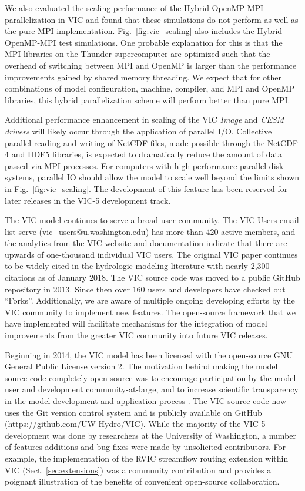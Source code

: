 \documentclass[gmd, manuscript]{copernicus}
\begin{document}
  We also evaluated the scaling performance of the Hybrid OpenMP-MPI parallelization in VIC and found that these simulations do not perform as well as the pure MPI implementation. Fig.~\ref{fig:vic_scaling} also includes the Hybrid OpenMP-MPI test simulations. One probable explanation for this is that the MPI libraries on the Thunder supercomputer are optimized such that the overhead of switching between MPI and OpenMP is larger than the performance improvements gained by shared memory threading. We expect that for other combinations of model configuration, machine, compiler, and MPI and OpenMP libraries, this hybrid parallelization scheme will perform better than pure MPI.

  Additional performance enhancement in scaling of the VIC \textit{Image} and \textit{CESM drivers} will likely occur through the application of parallel I/O. Collective parallel reading and writing of NetCDF files, made possible through the NetCDF-4 and HDF5 libraries, is expected to dramatically reduce the amount of data passed via MPI processes. For computers with high-performance parallel disk systems, parallel IO should allow the model to scale well beyond the limits shown in Fig.~\ref{fig:vic_scaling}. The development of this feature has been reserved for later releases in the VIC-5 development track.

\conclusions[Conclusions]
\label{sec:conclusions}

  The VIC model continues to serve a broad user community. The VIC Users email list-serve (\url{vic_users@u.washington.edu}) has more than 420 active members, and the analytics from the VIC website and documentation indicate that there are upwards of one-thousand individual VIC users. The original VIC paper \citep{Liang_1994} continues to be widely cited in the hydrologic modeling literature with nearly 2,300 citations as of January 2018. The VIC source code was moved to a public GitHub repository in 2013. Since then over 160 users and developers have checked out ``Forks''. Additionally, we are aware of multiple ongoing developing efforts by the VIC community to implement new features. The open-source framework that we have implemented will facilitate mechanisms for the integration of model improvements from the greater VIC community into future VIC releases.

  Beginning in 2014, the VIC model has been licensed with the open-source GNU General Public License version 2. The motivation behind making the model source code completely open-source was to encourage participation by the model user and development community-at-large, and to increase scientific transparency in the model development and application process \citep{Ince_2012}. The VIC source code now uses the Git version control system \citep{Torvalds_2010} and is publicly available on GitHub (\url{https://github.com/UW-Hydro/VIC}). While the majority of the VIC-5 development was done by researchers at the University of Washington, a number of features additions and bug fixes were made by unsolicited contributors. For example, the implementation of the RVIC streamflow routing extension within VIC (Sect. \ref{sec:extensions}) was a community contribution and provides a poignant illustration of the benefits of convenient open-source collaboration.
\end{document}

